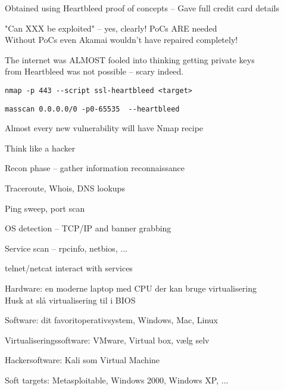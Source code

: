 \documentclass[Screen16to9,17pt]{foils}
\begin{document}
\begin{list2}
\item Obtained using Heartbleed proof of concepts -- Gave full credit card details
\item "Can XXX be exploited" -- yes, clearly! PoCs ARE needed\\
Without PoCs even Akamai wouldn't have repaired completely!
\item The internet was ALMOST fooled into thinking getting private keys\\
 from Heartbleed was not possible -- scary indeed.
\end{list2}



\begin{list1}
\item \verb+nmap -p 443 --script ssl-heartbleed <target>+\\
\item \verb+masscan 0.0.0.0/0 -p0-65535  --heartbleed+\\
\end{list1}

\centerline{Almost every new vulnerability will have Nmap recipe}



\begin{list1}
\item Think like a hacker
\item Recon phase -- gather information reconnaissance
\begin{list2}
\item Traceroute, Whois, DNS lookups
\item Ping sweep, port scan
\item OS detection -- TCP/IP and banner grabbing
\item Service scan -- rpcinfo, netbios, ...
\item telnet/netcat interact with services
\end{list2}
\end{list1}





\begin{list2}
\item Hardware: en moderne laptop med CPU der kan bruge virtualisering\\
Husk at slå virtualisering til i BIOS
\item Software: dit favoritoperativsystem, Windows, Mac, Linux
\item Virtualiseringssoftware: VMware, Virtual box, vælg selv
\item Hackersoftware: Kali som Virtual Machine 
\item Soft targets: Metasploitable, Windows 2000, Windows XP, ...
\end{list2}
\end{document}
